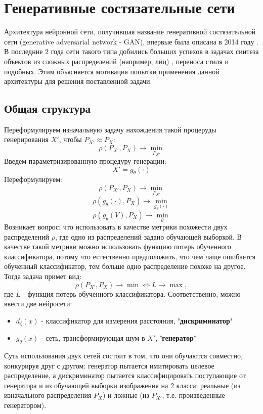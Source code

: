 \section{Генеративные состязательные сети}
	Архитектура нейронной сети, получившая название генеративной состязательной сети (generative adversarial network - GAN), впервые была описана в 2014 году \cite{GAN}. В последние 2 года сети такого типа добились больших успехов в задачах синтеза объектов из сложных распределений (например, лиц) \cite{cGAN-face}, переноса стиля \cite{algorithm-of-articsic-style} и подобных. Этим объясняется мотивация попытки применения данной архитектуры для решения поставленной задачи.
	\subsection{Общая структура}
		Переформулируем изначальную задачу нахождения такой процеруды генерирования $X'$, чтобы $ P_{X'} \approx P_X$:
		$$ \rho(P_{X'}, P_X) \longrightarrow \underset{P_{X'}}{\min} $$
		Введем параметризированную процедуру генерации:
		$$ X' = g_{\theta}(\cdot) $$
		Переформулируем:
		$$ \rho(P_{X'}, P_X) \longrightarrow \underset{P_{X'}}{\min} $$
		$$ \rho(g_{\theta}(\cdot), P_X) \longrightarrow \underset{g_{\theta}(\cdot)}{\min} $$
		$$ \rho(g_{\theta}(V), P_X) \longrightarrow \underset{\theta}{\min} $$
		Возникает вопрос: что использовать в качестве метрики похожести двух распределений $\rho$, где одно из распределений задано обучающей выборкой.
		В качестве такой метрики можно использовать функцию потерь обученного классификатора, потому что естественно предположить, что чем чаще ошибается обученный классификатор, тем больше одно распределение похоже на другое. Тогда задача примет вид:
		$$ \rho(P_{X'}, P_X) \longrightarrow \min \Leftrightarrow L \longrightarrow \max, $$
		где $L$ - функция потерь обученного классификатора.
		Соответственно, можно ввести две нейросети:
		\begin{itemize}
			\item $d_{\zeta}(x)$ - классификатор для измерения расстояния, \textbf{'дискриминатор'}
			\item $g_{\theta}(x)$ - сеть, трансформирующая шум в $X'$, \textbf{'генератор'}
		\end{itemize}
		Суть использования двух сетей состоит в том, что они обучаются совместно, конкурируя друг с другом: генератор пытается имитировать целевое распределение, а дискриминатор пытается классифицировать поступающие от генератора и из обучающей выборки изображения на 2 класса: реальные (из изначального распределения $P_X$) и ложные (из $P_{X'}$, т.е. произведенные генератором).
